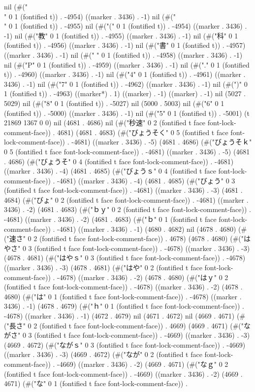 nil (#("\\" 0 1 (fontified t)) . -4954) ((marker . 3436) . -1) nil (#("\\" 0 1 (fontified t)) . -4955) nil (#("(" 0 1 (fontified t)) . -4954) ((marker . 3436) . -1) nil (#("教" 0 1 (fontified t)) . -4955) ((marker . 3436) . -1) nil (#("科" 0 1 (fontified t)) . -4956) ((marker . 3436) . -1) nil (#("書" 0 1 (fontified t)) . -4957) ((marker . 3436) . -1) nil (#(" " 0 1 (fontified t)) . -4958) ((marker . 3436) . -1) nil (#("P" 0 1 (fontified t)) . -4959) ((marker . 3436) . -1) nil (#("." 0 1 (fontified t)) . -4960) ((marker . 3436) . -1) nil (#("4" 0 1 (fontified t)) . -4961) ((marker . 3436) . -1) nil (#("7" 0 1 (fontified t)) . -4962) ((marker . 3436) . -1) nil (#(")" 0 1 (fontified t)) . -4963) ((marker*) . 1) ((marker) . -1) ((marker) . -1) nil (5027 . 5029) nil (#("8" 0 1 (fontified t)) . -5027) nil (5000 . 5003) nil (#("6" 0 1 (fontified t)) . -5000) ((marker . 3436) . -1) nil (#("5" 0 1 (fontified t)) . -5001) (t 21869 1367 0 0) nil (4681 . 4686) nil (#("秒速" 0 2 (fontified t face font-lock-comment-face)) . 4681) (4681 . 4683) (#("びょうそく" 0 5 (fontified t face font-lock-comment-face)) . -4681) ((marker . 3436) . -5) (4681 . 4686) (#("びょうそｋ" 0 5 (fontified t face font-lock-comment-face)) . -4681) ((marker . 3436) . -5) (4681 . 4686) (#("びょうそ" 0 4 (fontified t face font-lock-comment-face)) . -4681) ((marker . 3436) . -4) (4681 . 4685) (#("びょうｓ" 0 4 (fontified t face font-lock-comment-face)) . -4681) ((marker . 3436) . -4) (4681 . 4685) (#("びょう" 0 3 (fontified t face font-lock-comment-face)) . -4681) ((marker . 3436) . -3) (4681 . 4684) (#("びょ" 0 2 (fontified t face font-lock-comment-face)) . -4681) ((marker . 3436) . -2) (4681 . 4683) (#("ｂｙ" 0 2 (fontified t face font-lock-comment-face)) . -4681) ((marker . 3436) . -2) (4681 . 4683) (#("ｂ" 0 1 (fontified t face font-lock-comment-face)) . -4681) ((marker . 3436) . -1) (4680 . 4682) nil (4678 . 4680) (#("速さ" 0 2 (fontified t face font-lock-comment-face)) . 4678) (4678 . 4680) (#("はやさ" 0 3 (fontified t face font-lock-comment-face)) . -4678) ((marker . 3436) . -3) (4678 . 4681) (#("はやｓ" 0 3 (fontified t face font-lock-comment-face)) . -4678) ((marker . 3436) . -3) (4678 . 4681) (#("はや" 0 2 (fontified t face font-lock-comment-face)) . -4678) ((marker . 3436) . -2) (4678 . 4680) (#("はｙ" 0 2 (fontified t face font-lock-comment-face)) . -4678) ((marker . 3436) . -2) (4678 . 4680) (#("は" 0 1 (fontified t face font-lock-comment-face)) . -4678) ((marker . 3436) . -1) (4678 . 4679) (#("ｈ" 0 1 (fontified t face font-lock-comment-face)) . -4678) ((marker . 3436) . -1) (4672 . 4679) nil (4671 . 4672) nil (4669 . 4671) (#("長さ" 0 2 (fontified t face font-lock-comment-face)) . 4669) (4669 . 4671) (#("ながさ" 0 3 (fontified t face font-lock-comment-face)) . -4669) ((marker . 3436) . -3) (4669 . 4672) (#("ながｓ" 0 3 (fontified t face font-lock-comment-face)) . -4669) ((marker . 3436) . -3) (4669 . 4672) (#("なが" 0 2 (fontified t face font-lock-comment-face)) . -4669) ((marker . 3436) . -2) (4669 . 4671) (#("なｇ" 0 2 (fontified t face font-lock-comment-face)) . -4669) ((marker . 3436) . -2) (4669 . 4671) (#("な" 0 1 (fontified t face font-lock-comment-face)) . 